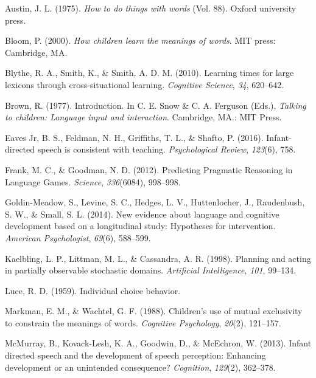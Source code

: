 \documentclass[10pt, letterpaper]{article}
\begin{document}
\noindent

\hypertarget{refs}{}
\leavevmode\hypertarget{ref-austin1975}{}%
Austin, J. L. (1975). \emph{How to do things with words} (Vol. 88).
Oxford university press.

\leavevmode\hypertarget{ref-bloom2000}{}%
Bloom, P. (2000). \emph{How children learn the meanings of words}. MIT
press: Cambridge, MA.

\leavevmode\hypertarget{ref-blythe2010}{}%
Blythe, R. A., Smith, K., \& Smith, A. D. M. (2010). Learning times for
large lexicons through cross-situational learning. \emph{Cognitive
Science}, \emph{34}, 620--642.

\leavevmode\hypertarget{ref-brown1977}{}%
Brown, R. (1977). Introduction. In C. E. Snow \& C. A. Ferguson (Eds.),
\emph{Talking to children: Language input and interaction}. Cambridge,
MA.: MIT Press.

\leavevmode\hypertarget{ref-eaves-jr2016}{}%
Eaves Jr, B. S., Feldman, N. H., Griffiths, T. L., \& Shafto, P. (2016).
Infant-directed speech is consistent with teaching. \emph{Psychological
Review}, \emph{123}(6), 758.

\leavevmode\hypertarget{ref-frank2012}{}%
Frank, M. C., \& Goodman, N. D. (2012). Predicting Pragmatic Reasoning
in Language Games. \emph{Science}, \emph{336}(6084), 998--998.

\leavevmode\hypertarget{ref-goldin-meadow2014}{}%
Goldin-Meadow, S., Levine, S. C., Hedges, L. V., Huttenlocher, J.,
Raudenbush, S. W., \& Small, S. L. (2014). New evidence about language
and cognitive development based on a longitudinal study: Hypotheses for
intervention. \emph{American Psychologist}, \emph{69}(6), 588--599.

\leavevmode\hypertarget{ref-kaelbling1998}{}%
Kaelbling, L. P., Littman, M. L., \& Cassandra, A. R. (1998). Planning
and acting in partially observable stochastic domains. \emph{Artificial
Intelligence}, \emph{101}, 99--134.

\leavevmode\hypertarget{ref-luce1959}{}%
Luce, R. D. (1959). Individual choice behavior.

\leavevmode\hypertarget{ref-markman1988}{}%
Markman, E. M., \& Wachtel, G. F. (1988). Children's use of mutual
exclusivity to constrain the meanings of words. \emph{Cognitive
Psychology}, \emph{20}(2), 121--157.

\leavevmode\hypertarget{ref-mcmurray2013}{}%
McMurray, B., Kovack-Lesh, K. A., Goodwin, D., \& McEchron, W. (2013).
Infant directed speech and the development of speech perception:
Enhancing development or an unintended consequence? \emph{Cognition},
\emph{129}(2), 362--378.
\end{document}
